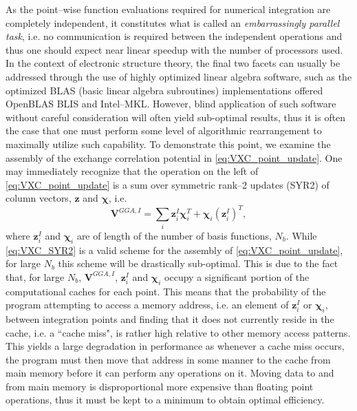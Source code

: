 As the point--wise
function evaluations required for numerical integration are completely independent, it constitutes what is called an
\emph{embarrassingly parallel task}, i.e. no communication is required between the independent operations and thus
one should expect near linear speedup with the number of processors used. 
In the context of electronic structure theory,
the final two facets can usually be addressed through the use of highly optimized linear algebra software, such as
the optimized BLAS (basic linear algebra subroutines) implementations offered OpenBLAS\cite{Qing13_ICHPC25,Yunquan12_PDS684} BLIS\cite{vanDeGeijn15_TOMS14} and Intel--MKL\cite{MKL}. 
However, blind application of such software without careful consideration will often yield sub-optimal results,
thus it is often the case that one must perform some level of algorithmic rearrangement to maximally utilize
such capability. 
To demonstrate this point, we examine the assembly of the exchange correlation potential
in \cref{eq:VXC_point_update}.
One may immediately recognize that the operation on the left of \cref{eq:VXC_point_update}
is a sum over symmetric rank--2 updates (SYR2) of column vectors, $\mathbf{z}$ and $\boldsymbol{\chi}$,
i.e.
\begin{equation}
\label{eq:VXC_SYR2}
\mathbf{V}^{GGA,I} = \sum_i \mathbf{z}^I_i \boldsymbol{\chi}_i^T + \boldsymbol{\chi}_i \left(\mathbf{z}^I_i\right)^T ,
\end{equation}
where $\mathbf{z}_i^I$ and $\boldsymbol{\chi}_i$ are of length of the number of basis functions, $N_b$. While \cref{eq:VXC_SYR2}
is a valid scheme for the assembly of \cref{eq:VXC_point_update}, for large $N_b$ this scheme will be drastically sub-optimal.
This is due to the fact that, for large $N_b$, $\mathbf{V}^{GGA,I}$, $\mathbf{z}_i^I$ and $\boldsymbol{\chi}_i$ occupy a significant
portion of the computational caches for each point. This means that the probability of the program attempting to access
a memory address, i.e. an element of $\mathbf{z}_i^I$ or $\boldsymbol{\chi}_i$, between integration points and finding that it does not
currently reside in the cache, i.e. a ``cache miss", is rather high relative to other memory access patterns. This yields a
large degradation in performance as whenever a cache miss occurs, the program must then move that address in some manner to
the cache from main memory before it can perform any operations on it. Moving data to and from main memory is disproportional
more expensive than floating point operations, thus it must be kept to a minimum to obtain
optimal efficiency.

